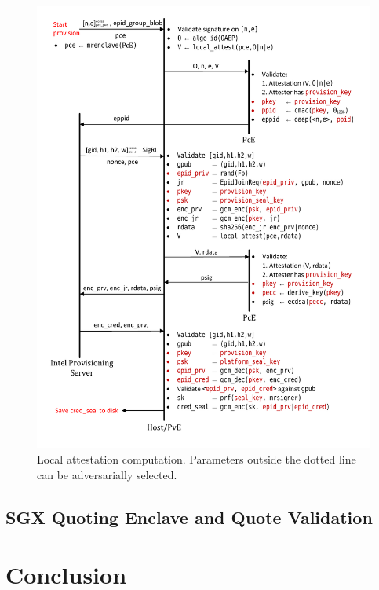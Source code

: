 \documentclass[10pt]{article}
\begin{document}
  \begin{figure}
  \centering
  \includegraphics[width=0.8\linewidth]{Diagrams/EpidProvisioning}
  \caption{Local attestation computation. Parameters outside the
    dotted line can be adversarially selected.}
  \label{fig:epidprov}
  \end{figure}

  \subsection{SGX Quoting Enclave and Quote Validation}
  \label{ssec:qe}

  \section{Conclusion}
  \label{sec:conclusion}



\end{document}
